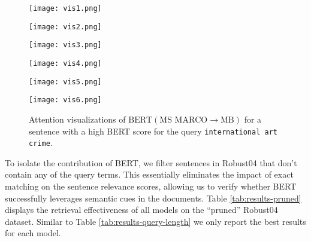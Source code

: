 \begin{figure}
	\centering
    \begin{minipage}{0.3\textwidth}
        \centering
        \texttt{[image: vis1.png]}
    \end{minipage}\hfill
    \begin{minipage}{0.3\textwidth}
        \centering
        \texttt{[image: vis2.png]}
    \end{minipage}\hfill
    \begin{minipage}{0.3\textwidth}
        \centering
        \texttt{[image: vis3.png]}
    \end{minipage}
     \begin{minipage}{0.3\textwidth}
        \centering
        \texttt{[image: vis4.png]}
    \end{minipage}\hfill
    \begin{minipage}{0.3\textwidth}
        \centering
        \texttt{[image: vis5.png]}
    \end{minipage}\hfill
    \begin{minipage}{0.3\textwidth}
        \centering
        \texttt{[image: vis6.png]}
    \end{minipage}
\caption{Attention visualizations of $ \textrm{BERT} (\textrm{MS MARCO}\rightarrow\textrm{MB}) $ for a sentence with a high BERT score for the query \texttt{international art crime}.}
\label{fig:attention}
\end{figure}


To isolate the contribution of BERT, we filter sentences in Robust04 that don't contain any of the query terms.
This essentially eliminates the impact of exact matching on the sentence relevance scores, allowing us to verify whether BERT successfully leverages semantic cues in the documents.
Table \ref{tab:results-pruned} displays the retrieval effectiveness of all models on the ``pruned'' Robust04 dataset.
Similar to Table \ref{tab:results-query-length} we only report the best results for each model.

